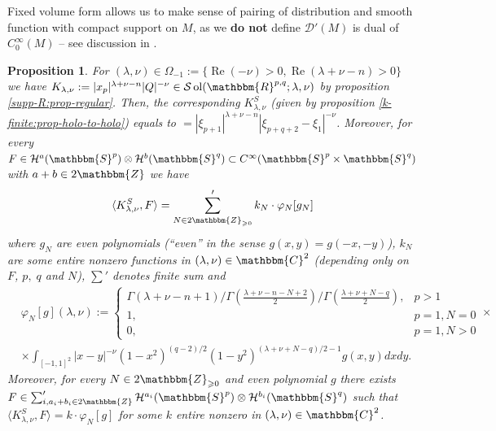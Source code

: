 \documentclass{article}
\newcommand{\assign}{:=}
\newcommand{\tmop}[1]{\ensuremath{\operatorname{#1}}}
\newcommand{\tmtextbf}[1]{{\bfseries{#1}}}
\newcommand{\upl}{+}
\numberwithin{definition}{section}
\numberwithin{lemma}{section}
\newtheorem{proposition}{Proposition}
\numberwithin{proposition}{section}
{\theorembodyfont{\rmfamily}\newtheorem{remark}{Remark}
\numberwithin{remark}{section}
}
\begin{document}
\begin{remark}
  Fixed volume form allows us to make sense of pairing of distribution and
  smooth function with compact support on $M$, as we \tmtextbf{do not} define
  $\mathcal{D}' ( M)$ is dual of $C_0^{\infty} ( M)$ -- see discussion in
  {\cite[sec 6.3]{hormander1983analysis}}.
\end{remark}

\begin{proposition}
  \label{k-finite:prop-KR-hook-1}For $( \lambda, \nu) \in \Omega_{- 1} \assign
  \{ \tmop{Re} ( - \nu) > 0, \tmop{Re} ( \lambda + \nu - n) > 0 \}$ we have
  $K_{\lambda, \nu} \assign | x_p |^{\lambda + \nu - n} | Q |^{- \nu} \in
  \mathcal{S} \tmop{ol} ( \mathbbm{R}^{p, q} ; \lambda, \nu)$ by proposition
  \ref{supp-R:prop-regular}. Then, the corresponding $K_{\lambda, \nu}^S$
  (given by proposition \ref{k-finite:prop-holo-to-holo}) equals to $= |
  \xi_{p + 1} |^{\lambda + \nu - n} | \xi_{p + q + 2} - \xi_1 |^{- \nu}$.
  Moreover, for every $F \in \mathcal{H}^a ( \mathbbm{S}^p) \otimes
  \mathcal{H}^b ( \mathbbm{S}^q) \subset C^{\infty} ( \mathbbm{S}^p \times
  \mathbbm{S}^q)$ with $a + b \in 2\mathbbm{Z}$ we have
  \begin{equation}
    \langle K^S_{\lambda, \nu}, F \rangle = \sum'_{N \in
    2\mathbbm{Z}_{\geqslant 0}} k_N \cdot \varphi_N [ g_N]
    \label{k-finite:eq-hookR}
  \end{equation}
  where $g_N$ are even polynomials (``even'' in the sense $g ( x, y) = g ( -
  x, - y)$), $k_N$ are some entire nonzero functions in $( \lambda, \nu) \in
  \mathbbm{C}^2$ (depending only on $F$, $p, \; q$ and $N$), $\sum'$ denotes
  finite sum and
  \begin{eqnarray}
    & \varphi_N [ g] ( \lambda, \nu) \assign \left\{ \begin{array}{ll}
      \Gamma ( \lambda + \nu - n + 1) / \Gamma \left( \frac{\lambda + \nu - n
      - N \upl 2}{2} \right) / \Gamma \left( \frac{\lambda + \nu + N - q}{2}
      \right), & p > 1\\
      1, & p = 1, N = 0\\
      0, & p = 1, N > 0
    \end{array} \right. \times &  \nonumber\\
    & \times \int_{[ - 1, 1]^2} | x - y |^{- \nu} ( 1 - x^2)^{( q - 2) / 2} (
    1 - y^2)^{( \lambda + \nu + N - q) / 2 - 1} g ( x, y) d x d y. & 
    \nonumber
  \end{eqnarray}
  Moreover, for every $N \in 2\mathbbm{Z}_{\geqslant 0}$ and even polynomial
  $g$ there exists $F \in \sum_{i, a_i + b_i \in 2\mathbbm{Z}}'
  \mathcal{H}^{a_i} ( \mathbbm{S}^p) \otimes \mathcal{H}^{b_i} (
  \mathbbm{S}^q)$ such that $\langle K_{\lambda, \nu}^S, F \rangle = k \cdot
  \varphi_N [ g]$ for some $k$ entire nonzero in $( \lambda, \nu) \in
  \mathbbm{C}^2$.
\end{proposition}
\end{document}
